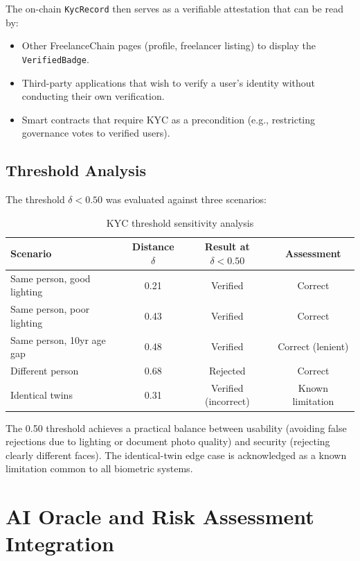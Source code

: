 The on-chain \texttt{KycRecord} then serves as a verifiable attestation that can be read by:
\begin{itemize}
    \item Other FreelanceChain pages (profile, freelancer listing) to display the \texttt{VerifiedBadge}.
    \item Third-party applications that wish to verify a user's identity without conducting their own verification.
    \item Smart contracts that require KYC as a precondition (e.g., restricting governance votes to verified users).
\end{itemize}

\subsection{Threshold Analysis}

The threshold $\delta < 0.50$ was evaluated against three scenarios:

\begin{table}[H]
\centering
\caption{KYC threshold sensitivity analysis}
\label{table:kyc_threshold}
\begin{tabular}{|l|c|c|c|}
\hline
\textbf{Scenario} & \textbf{Distance $\delta$} & \textbf{Result at $\delta<0.50$} & \textbf{Assessment} \\ \hline
Same person, good lighting & 0.21 & Verified & Correct \\ \hline
Same person, poor lighting & 0.43 & Verified & Correct \\ \hline
Same person, 10yr age gap & 0.48 & Verified & Correct (lenient) \\ \hline
Different person & 0.68 & Rejected & Correct \\ \hline
Identical twins & 0.31 & Verified (incorrect) & Known limitation \\ \hline
\end{tabular}
\end{table}

The 0.50 threshold achieves a practical balance between usability (avoiding false rejections due to lighting or document photo quality) and security (rejecting clearly different faces). The identical-twin edge case is acknowledged as a known limitation common to all biometric systems.

\section{AI Oracle and Risk Assessment Integration}
\label{section:5.4}

